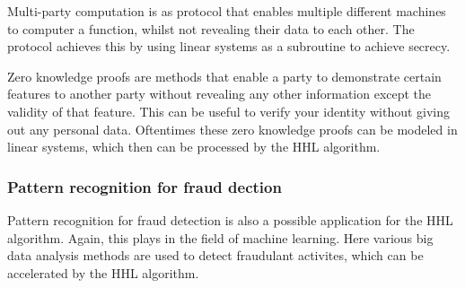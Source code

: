     Multi-party computation is as protocol that enables multiple different machines to computer a function, whilst not revealing their data to each other. 
    The protocol achieves this by using linear systems as a subroutine to achieve secrecy.

    Zero knowledge proofs are methods that enable a party to demonstrate certain features to another party without revealing any other information except the validity of that feature.
    This can be useful to verify your identity without giving out any personal data.
    Oftentimes these zero knowledge proofs can be modeled in linear systems, which then can be processed by the HHL algorithm.

    \subsubsection{Pattern recognition for fraud dection}
    Pattern recognition for fraud detection is also a possible application for the HHL algorithm.
    Again, this plays in the field of machine learning. 
    Here various big data analysis methods are used to detect fraudulant activites, which can be accelerated by the HHL algorithm.








